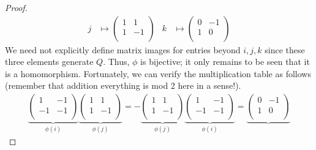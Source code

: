 \documentclass[../psets.tex]{subfiles}
\begin{document}
\begin{enumerate}
\begin{proof}
\begin{align*}
            j &\mapsto
            \begin{pmatrix}
                1 & 1\\
                1 & -1\\
            \end{pmatrix}&
            k &\mapsto
            \begin{pmatrix}
                0 & -1\\
                1 & 0\\
            \end{pmatrix}
        \end{align*}
        We need not explicitly define matrix images for entries beyond $i,j,k$ since these three elements generate $Q$. Thus, $\phi$ is bijective; it only remains to be seen that it is a homomorphism. Fortunately, we can verify the multiplication table as follows (remember that addition everything is mod 2 here in a sense!).
        \begin{gather*}
            \underbrace{
                \begin{pmatrix}
                    1 & -1\\
                    -1 & -1\\
                \end{pmatrix}
            }_{\phi(i)}
            \underbrace{
                \begin{pmatrix}
                    1 & 1\\
                    1 & -1\\
                \end{pmatrix}
            }_{\phi(j)}
            =
            -\underbrace{
                \begin{pmatrix}
                    1 & 1\\
                    1 & -1\\
                \end{pmatrix}
            }_{\phi(j)}
            \underbrace{
                \begin{pmatrix}
                    1 & -1\\
                    -1 & -1\\
                \end{pmatrix}
            }_{\phi(i)}
            =
            \underbrace{
                \begin{pmatrix}
                    0 & -1\\
                    1 & 0\\

\end{pmatrix}}
\end{gather*}
\end{proof}
\end{enumerate}
\end{document}
